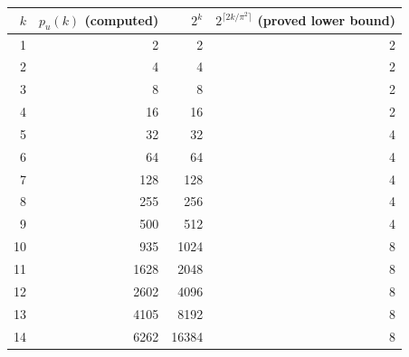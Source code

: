 \begin{tabular}{@{}rrrr@{}}\toprule
$k$ & $p_u(k)$ (computed) & $2^k$ & $2^{\lceil 2k/\pi^2\rceil}$ (proved lower bound)\\\midrule
1 & 2 & 2 & 2 \\
2 & 4 & 4 & 2 \\
3 & 8 & 8 & 2 \\
4 & 16 & 16 & 2 \\
5 & 32 & 32 & 4 \\
6 & 64 & 64 & 4 \\
7 & 128 & 128 & 4 \\
8 & 255 & 256 & 4 \\
9 & 500 & 512 & 4 \\
10 & 935 & 1024 & 8 \\
11 & 1628 & 2048 & 8 \\
12 & 2602 & 4096 & 8 \\
13 & 4105 & 8192 & 8 \\
14 & 6262 & 16384 & 8 \\
\bottomrule\end{tabular}
